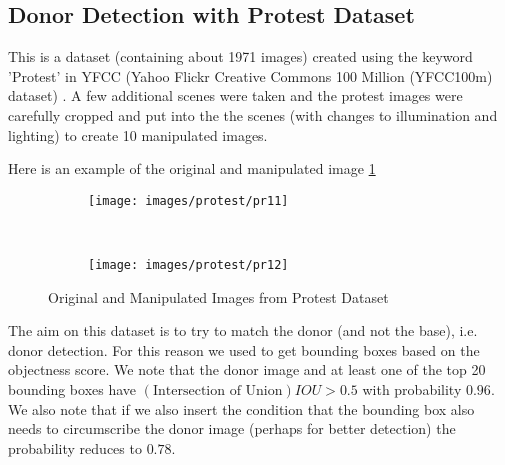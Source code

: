 \documentclass{article}
\begin{document}


\subsection{Donor Detection with Protest Dataset}
This is a dataset (containing about 1971 images) created using the keyword 'Protest' in YFCC (Yahoo Flickr Creative Commons 100 Million (YFCC100m) dataset) \cite{DBLP:journals/corr/ThomeeSFENPBL15}. A few additional scenes were taken and the protest images were carefully cropped and put into the the scenes (with changes to illumination and lighting) to create 10 manipulated images.

Here is an example of the original and manipulated image \ref{fig:pr_imgs}
\begin{figure}[H]
  \centering
  \begin{subfigure}[H]{0.4\linewidth}
    \texttt{[image: images/protest/pr11]}
  \end{subfigure}
  ~
  \begin{subfigure}[H]{0.4\linewidth}
    \texttt{[image: images/protest/pr12]}
  \end{subfigure}
  \caption{Original and Manipulated Images from Protest Dataset}
  \label{fig:pr_imgs}
\end{figure}

The aim on this dataset is to try to match the donor (and not the base), i.e. donor detection. For this reason we used\cite{6126456} to get bounding boxes based on the objectness score. We note that the donor image and at least one of the top 20 bounding boxes have $(\text{Intersection of Union})IOU > 0.5$ with probability $0.96$. We also note that if we also insert the condition that the bounding box also needs to circumscribe the donor image (perhaps for better detection) the probability reduces to $0.78$.
\end{document}

